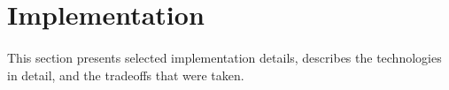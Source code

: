 \section{Implementation\label{Implementation}}
\paragraph{}
This section presents selected implementation details, describes the technologies in detail, and the tradeoffs that were taken.

























